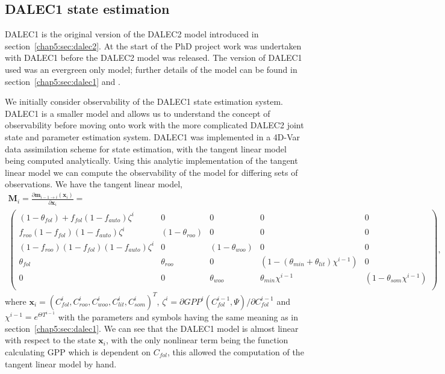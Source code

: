 \subsection{DALEC1 state estimation} \label{chap5:sec:D1observability}

DALEC1 is the original version of the DALEC2 model introduced in section~\ref{chap5:sec:dalec2}. At the start of the PhD project work was undertaken with DALEC1 before the DALEC2 model was released. The version of DALEC1 used was an evergreen only model; further details of the model can be found in section~\ref{chap5:sec:dalec1} and \citet{williams2005improved}. 

We initially consider observability of the DALEC1 state estimation system. DALEC1 is a smaller model and allows us to understand the concept of observability before moving onto work with the more complicated DALEC2 joint state and parameter estimation system. DALEC1 was implemented in a 4D-Var data assimilation scheme for state estimation, with the tangent linear model being computed analytically. Using this analytic implementation of the tangent linear model we can compute the observability of the model for differing sets of observations. We have the tangent linear model,
\begin{multline}
\mathbf{M}_{i} = \frac{\partial \textbf{m}_{i-1\rightarrow i}(\textbf{x}_{i})}{\partial \textbf{x}_{i}} = 
\\ \begin{pmatrix}  
(1-\theta_{fol})+f_{fol}(1-f_{auto})\zeta^i & 0 & 0 & 0 & 0 \\
f_{roo}(1-f_{fol})(1-f_{auto})\zeta^i & (1-\theta_{roo}) & 0 & 0 & 0 \\
(1-f_{roo})(1-f_{fol})(1-f_{auto})\zeta^i & 0 & (1-\theta_{woo}) & 0 & 0 \\
\theta_{fol} & \theta_{roo} & 0 & (1-(\theta_{min}+\theta_{lit})\chi^{i-1}) & 0 \\
0 & 0 & \theta_{woo} & \theta_{min}\chi^{i-1} & (1-\theta_{som}\chi^{i-1}) \\
\end{pmatrix}, \label{chap5:eqn:linmod}
\end{multline}
where \(\textbf{x}_{i}=(C_{fol}^{i}, C_{roo}^{i}, C_{woo}^{i}, C_{lit}^{i}, C_{som}^{i})^{T}\), \(\zeta^i = \partial GPP^{i}(C_{fol}^{i-1}, \Psi)/\partial C_{fol}^{i-1}\) and \(\chi^{i-1}=e^{\Theta T^{i-1}}\) with the parameters and symbols having the same meaning as in section~\ref{chap5:sec:dalec1}. We can see that the DALEC1 model is almost linear with respect to the state \(\textbf{x}_{i}\), with the only nonlinear term being the function calculating GPP which is dependent on \(C_{fol}\), this allowed the computation of the tangent linear model by hand. 


